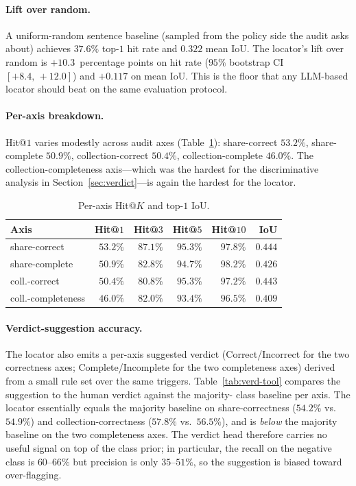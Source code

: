 \documentclass[11pt,a4paper]{article}
\begin{document}
\paragraph{Lift over random.}
A uniform-random sentence baseline (sampled from the policy side the
audit asks about) achieves $37.6\%$ top-$1$ hit rate and $0.322$
mean IoU. The locator's lift over random is $+10.3$~percentage points
on hit rate ($95\%$ bootstrap CI $[+8.4,\,+12.0]$) and $+0.117$ on
mean IoU. This is the floor that any LLM-based locator should beat
on the same evaluation protocol.

\paragraph{Per-axis breakdown.}
Hit@$1$ varies modestly across audit axes (Table~\ref{tab:perax-tool}):
share-correct $53.2\%$, share-complete $50.9\%$, collection-correct
$50.4\%$, collection-complete $46.0\%$. The collection-completeness
axis---which was the hardest for the discriminative analysis in
Section~\ref{sec:verdict}---is again the hardest for the locator.

\begin{table}[t]
\centering\small
\caption{Per-axis Hit@$K$ and top-$1$ IoU.}
\label{tab:perax-tool}
\begin{tabular}{lrrrrr}
\toprule
Axis  & Hit@$1$ & Hit@$3$ & Hit@$5$ & Hit@$10$ & IoU \\
\midrule
share-correct      & $53.2\%$ & $87.1\%$ & $95.3\%$ & $97.8\%$ & $0.444$ \\
share-complete     & $50.9\%$ & $82.8\%$ & $94.7\%$ & $98.2\%$ & $0.426$ \\
coll.-correct      & $50.4\%$ & $80.8\%$ & $95.3\%$ & $97.2\%$ & $0.443$ \\
coll.-completeness & $46.0\%$ & $82.0\%$ & $93.4\%$ & $96.5\%$ & $0.409$ \\
\bottomrule
\end{tabular}
\end{table}

\paragraph{Verdict-suggestion accuracy.}
The locator also emits a per-axis suggested verdict
(Correct/Incorrect for the two correctness axes;
Complete/Incomplete for the two completeness axes) derived from a
small rule set over the same triggers. Table~\ref{tab:verd-tool}
compares the suggestion to the human verdict against the majority-
class baseline per axis. The locator essentially equals the majority
baseline on share-correctness ($54.2\%$ vs.\ $54.9\%$) and
collection-correctness ($57.8\%$ vs.\ $56.5\%$), and is
\emph{below} the majority baseline on the two completeness axes.
The verdict head therefore carries no useful signal on top of the
class prior; in particular, the recall on the negative class is
$60$--$66\%$ but precision is only $35$--$51\%$, so the suggestion
is biased toward over-flagging.
\end{document}
